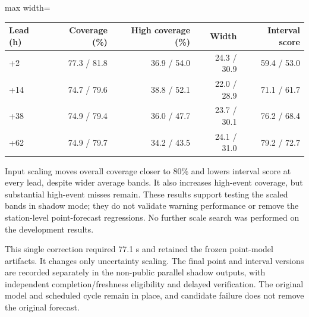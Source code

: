 \documentclass[11pt,a4paper]{article}
\begin{document}
\begin{table}[H]
\centering
\small
\begin{adjustbox}{max width=\linewidth}
\begin{tabular}{lrrrr}
\toprule
Lead (h) & Coverage (\%) & High coverage (\%) & Width & Interval score \\
\midrule
+2 & 77.3 / 81.8 & 36.9 / 54.0 & 24.3 / 30.9 & 59.4 / 53.0 \\
+14 & 74.7 / 79.6 & 38.8 / 52.1 & 22.0 / 28.9 & 71.1 / 61.7 \\
+38 & 74.9 / 79.4 & 36.0 / 47.7 & 23.7 / 30.1 & 76.2 / 68.4 \\
+62 & 74.9 / 79.7 & 34.2 / 43.5 & 24.1 / 31.0 & 79.2 / 72.7 \\
\bottomrule
\end{tabular}
\end{adjustbox}
\end{table}

Input scaling moves overall coverage closer to 80\% and lowers interval score at every lead, despite wider average bands. It also increases high-event coverage, but substantial high-event misses remain. These results support testing the scaled bands in shadow mode; they do not validate warning performance or remove the station-level point-forecast regressions. No further scale search was performed on the development results.

This single correction required 77.1 s and retained the frozen point-model artifacts. It changes only uncertainty scaling. The final point and interval versions are recorded separately in the non-public parallel shadow outputs, with independent completion/freshness eligibility and delayed verification. The original model and scheduled cycle remain in place, and candidate failure does not remove the original forecast.
\end{document}

